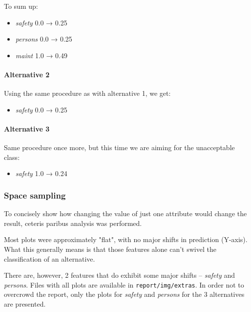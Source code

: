 \documentclass[../main.tex]{subfiles}
\begin{document}
\noindent
To sum up:
\begin{itemize}
	\item \emph{safety} 0.0 → 0.25
	\item \emph{persons} 0.0 → 0.25
	\item \emph{maint} 1.0 → 0.49
\end{itemize}

\paragraph{Alternative 2} Using the same procedure as with alternative 1, we
get:
\begin{itemize}
	\item \emph{safety} 0.0 → 0.25
\end{itemize}
\paragraph{Alternative 3} Same procedure once more, but this time we are aiming
for the unacceptable class:
\begin{itemize}
	\item \emph{safety} 1.0 → 0.24
\end{itemize}

\subsubsection{Space sampling}
To concisely show how changing the value of just one attribute would change the
result, ceteris paribus analysis was performed.

Most plots were approximately "flat", with no major shifts in prediction
(Y-axis). What this generally means is that those features alone can't swivel
the classification of an alternative.

There are, however, 2 features that do exhibit some major shifts --
\emph{safety} and \emph{persons}. Files with all plots are available in
\verb`report/img/extras`. In order not to overcrowd the report, only the plots
for \emph{safety} and \emph{persons} for the 3 alternatives are presented.
\end{document}
